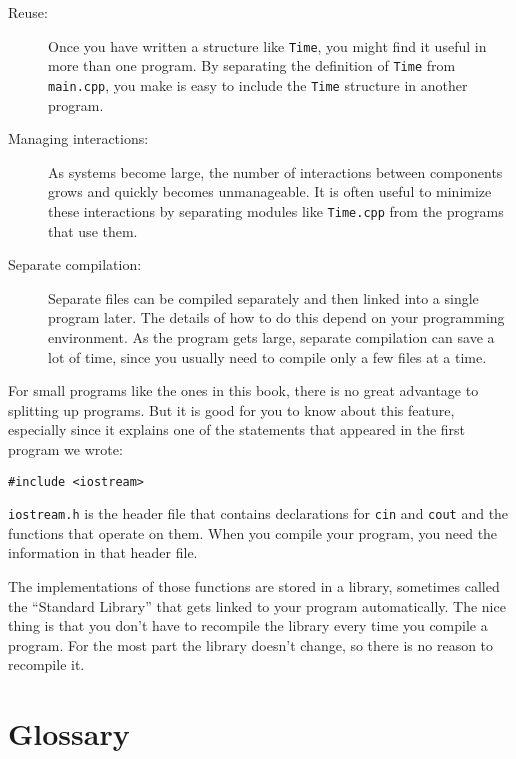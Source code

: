 \begin{description}

\item[Reuse:]  Once you have written a structure like {\tt Time},
you might find it useful in more than one program.  By separating
the definition of {\tt Time} from {\tt main.cpp}, you make is easy
to include the {\tt Time} structure in another program.

\item[Managing interactions:]  As systems become large, the number
of interactions between components grows and quickly becomes
unmanageable.  It is often useful to minimize these interactions
by separating modules like {\tt Time.cpp} from the programs that
use them.

\item[Separate compilation:]  Separate files can be compiled
separately and then linked into a single program later.  The details
of how to do this depend on your programming environment.  As
the program gets large, separate compilation can save a lot of time,
since you usually need to compile only a few files at a time.

\end{description}

For small programs like the ones in this book, there is
no great advantage to splitting up programs.  But it is good
for you to know about this feature, especially since it explains
one of the statements that appeared in the first program we
wrote:

\begin{verbatim}
#include <iostream>
\end{verbatim}
%
{\tt iostream.h} is the header file that contains declarations
for {\tt cin} and {\tt cout} and the functions that operate on
them.  When you compile your program, you need the information
in that header file.

The implementations of those functions are stored in a library,
sometimes called the ``Standard Library'' that gets linked to
your program automatically.  The nice thing is that you don't
have to recompile the library every time you compile a program.
For the most part the library doesn't change, so there is no
reason to recompile it.

\section{Glossary}

